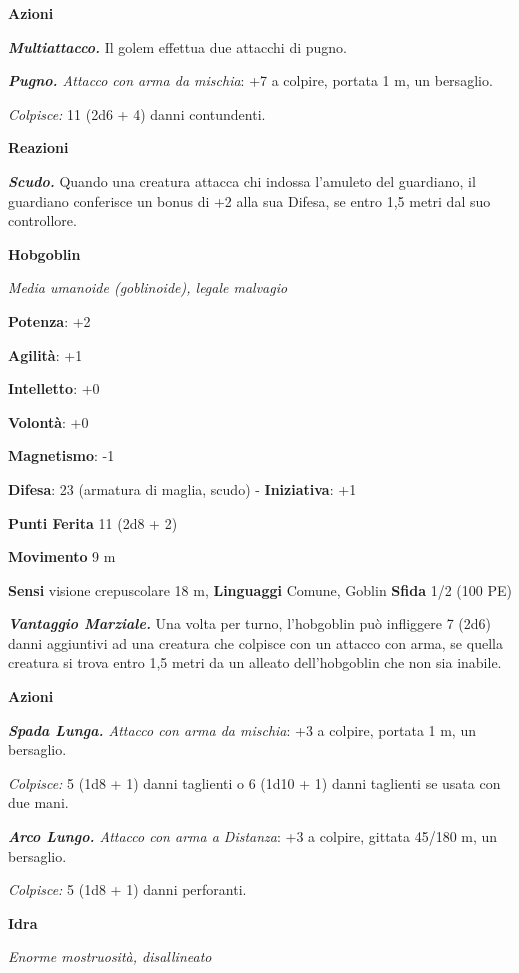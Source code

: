 \begin{multicols}{2}
\smallskip\textbf{Azioni}

\emph{\textbf{Multiattacco.}} Il golem effettua due attacchi di pugno.

\emph{\textbf{Pugno.} Attacco con arma da mischia}: +7 a colpire,
portata 1 m, un bersaglio.

\emph{Colpisce:} 11 (2d6 + 4) danni contundenti.

\textbf{Reazioni}

\emph{\textbf{Scudo.}} Quando una creatura attacca chi indossa l'amuleto
del guardiano, il guardiano conferisce un bonus di +2 alla sua Difesa, se
entro 1,5 metri dal suo controllore.

\textbf{Hobgoblin}

\emph{Media umanoide (goblinoide), legale malvagio}

\textbf{Potenza}: +2

\textbf{Agilità}: +1

\textbf{Intelletto}: +0

\textbf{Volontà}: +0

\textbf{Magnetismo}: -1

\textbf{Difesa}: 23 (armatura di maglia, scudo) - \textbf{Iniziativa}: +1

\textbf{Punti Ferita} 11 (2d8 + 2)

\textbf{Movimento} 9 m

\textbf{Sensi} visione crepuscolare 18 m, 
\textbf{Linguaggi} Comune, Goblin \textbf{Sfida} 1/2 (100 PE)\smallskip

\emph{\textbf{Vantaggio Marziale.}} Una volta per turno, l'hobgoblin può
infliggere 7 (2d6) danni aggiuntivi ad una creatura che colpisce con un
attacco con arma, se quella creatura si trova entro 1,5 metri da un
alleato dell'hobgoblin che non sia inabile.

\smallskip\textbf{Azioni}

\emph{\textbf{Spada Lunga.} Attacco con arma da mischia}: +3 a colpire,
portata 1 m, un bersaglio.

\emph{Colpisce:} 5 (1d8 + 1) danni taglienti o 6 (1d10 + 1) danni
taglienti se usata con due mani.

\emph{\textbf{Arco Lungo.} Attacco con arma a Distanza}: +3 a colpire,
gittata 45/180 m, un bersaglio.

\emph{Colpisce:} 5 (1d8 + 1) danni perforanti.



\textbf{Idra}

\emph{Enorme mostruosità, disallineato}


\end{multicols}
